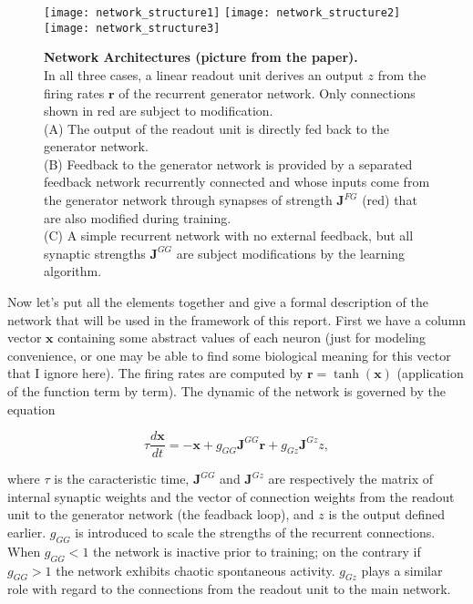 \begin{figure}[H]
  \centering
  \texttt{[image: network\_structure1]}
  \hfill
  \texttt{[image: network\_structure2]}
  \hfill
  \texttt{[image: network\_structure3]}
  \caption{
    \textbf{Network Architectures (picture from the paper).}\\[0.1em]
    In all three cases, a linear readout unit derives an output $z$
    from the firing rates $\mathbf{r}$ of the recurrent generator network.
    Only connections shown in red are subject to modification.\\[0.1em]
    (A) The output of the readout unit is directly fed back to the
    generator network.\\[0.1em]
    (B) Feedback to the generator network is provided by a separated
    feedback network recurrently connected and whose inputs come from
    the generator network through synapses of strength $\mathbf{J}^{FG}$
    (red) that are also modified during training.\\[0.1em]
    (C) A simple recurrent network with no external feedback, but all
    synaptic strengths $\mathbf{J}^{GG}$ are subject modifications by
    the learning algorithm.
  }
  \label{fig: network_structures}
\end{figure}

Now let's put all the elements together and give a formal description of
the network that will be used in the framework of this report. First
we have a column vector $\mathbf{x}$ containing some abstract values of
each neuron (just for modeling convenience, or one may be able to find
some biological meaning for this vector that I ignore here). The firing
rates are computed by $\mathbf{r} = \tanh(\mathbf{x})$ (application of
the function term by term). The dynamic of the network is governed by
the equation

\[
  \tau \frac{d\mathbf{x}}{dt} = 
  -\mathbf{x} + g_{GG}\mathbf{J}^{GG}\mathbf{r}
  + g_{Gz} \mathbf{J}^{Gz} z,
\]

\noindent
where $\tau$ is the caracteristic time, $\mathbf{J}^{GG}$ and 
$\mathbf{J}^{Gz}$ are respectively the matrix of internal synaptic 
weights and the vector of connection weights from the readout unit 
to the generator network (the feadback loop), and $z$ is the output
defined earlier. $g_{GG}$ is introduced to scale the strengths of 
the recurrent connections. When $g_{GG}<1$ the network is inactive prior to
training; on the contrary if $g_{GG}>1$ the network exhibits chaotic
spontaneous activity. $g_{Gz}$ plays a similar role with regard to the 
connections from the readout unit to the main network.

